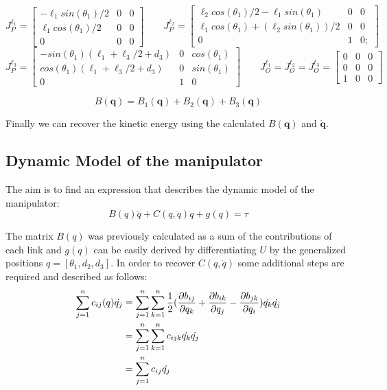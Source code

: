 \documentclass[a4paper,12pt]{article}
\renewcommand*{\l}{\ell}
\begin{document}
\[
    J^{\l_1}_{P} = \begin{bmatrix}
        -\l_1sin(\theta_1)/2 & 0 & 0 \\
 \l_1cos(\theta_1)/2 &0 &0 \\
               0 &0 &0
    \end{bmatrix}
    \qquad
    J^{\l_2}_{P} = \begin{bmatrix}
        \l_2cos(\theta_1)/2 - \l_1sin(\theta_1) &0 &0\\
\l_1cos(\theta_1) + (\l_2sin(\theta_1))/2& 0 &0\\
                            0& 1& 0;
    \end{bmatrix}
\]
\[
    J^{\l_3}_{P} = \begin{bmatrix}
        -sin(\theta_1)(\l_1 + \l_3/2 + d_3) &0 & cos(\theta_1)\\
 cos(\theta_1)(\l_1 + \l_3/2 + d_3) &0 &sin(\theta_1)\\
                          0 &1 &      0
    \end{bmatrix}
    \qquad
    J^{\l_1}_{O} = J^{\l_2}_{O} = J^{\l_3}_{O} =\begin{bmatrix}
        0 &0 &0\\ 0& 0 &0\\ 1& 0& 0
    \end{bmatrix}
\]

\[
  B(\textbf{q}) = B_1(\textbf{q}) + B_2(\textbf{q}) +B_3(\textbf{q}) 
\]

\noindent Finally we can recover the kinetic energy using the calculated $B(\textbf{q})$ and $ \dot{\textbf{q}}$.

\subsection{Dynamic Model of the manipulator}
The aim is to find an expression that describes the dynamic model of the manipulator:
\[
    B(q)\ddot{q} + C(q, \dot{q})\dot{q} + g(q) = \tau
\]

\noindent The matrix $B(q)$ was previously calculated as a sum of the contributions of each link and $g(q)$ can be easily derived by differentiating $U$ by the generalized positions $q = [\theta_1,d_2, d_3]$. In order to recover $C(q,\dot{q})$ some additional steps are required and described as follows:
\begin{equation}
    \begin{aligned}
        \sum_{j=1}^{n} c_{ij}(q)\dot{q_j}  &= \sum_{j=1}^{n}\sum_{k=1}^{n} \frac{1}{2} (\pdv{b_{ij}}{q_k}+\pdv{b_{ik}}{q_j}-\pdv{b_{jk}}{q_i})\dot{q_k}\dot{q_j} \\
         &= \sum_{j=1}^{n}\sum_{k=1}^{n} c_{ijk}\dot{q_k}\dot{q_j} \\
         &= \sum_{j=1}^{n} c_{ij}\dot{q_j}
    \end{aligned}
\end{equation}
\end{document}
